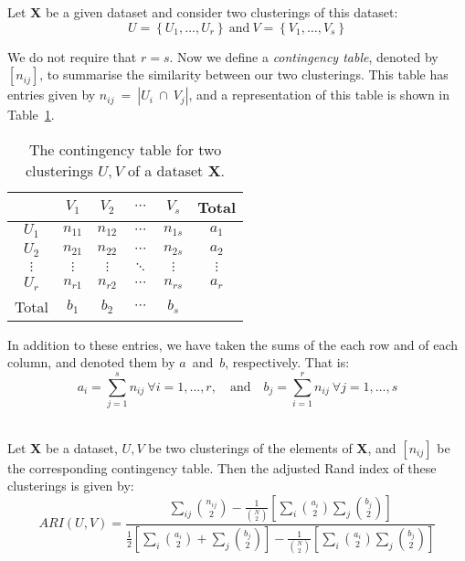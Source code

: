\begin{definition}\label{def:contingency}
    Let \textbf{X} be a given dataset and consider two clusterings of this
    dataset:
    \[
        U = \left\{U_1, \ldots, U_r\right\}
        \ \text{and} \
        V = \left\{V_1, \ldots, V_s\right\}
    \]

    We do not require that \(r = s\). Now we define a \emph{contingency table},
    denoted by \(\left[n_{ij}\right]\), to summarise the similarity between our
    two clusterings. This table has entries given by
    \(n_{ij}~=~|U_i~\cap~V_j|\), and a representation of this table is shown in
    Table~\ref{tab:contingency}.

    \begin{table}[H]
    \centering
    \begin{tabular}{cccccc}
        {} & \(V_1\) & \(V_2\) & \(\cdots\) & \(V_s\) & Total
        \\ \midrule
        \(U_1\) & \(n_{11}\) & \(n_{12}\) & \(\cdots\) & \(n_{1s}\) & \(a_1\)
        \\
        \(U_2\) & \(n_{21}\) & \(n_{22}\) & \(\cdots\) & \(n_{2s}\) & \(a_2\)
        \\
        \(\vdots\) & \(\vdots\) & \(\vdots\) & \(\ddots\) & \(\vdots\) &
        \(\vdots\)
        \\
        \(U_r\) & \(n_{r1}\) & \(n_{r2}\) & \(\cdots\) & \(n_{rs}\) & \(a_r\)
        \\ \midrule
        Total & \(b_1\) & \(b_2\) & \(\cdots\) & \(b_s\) & {}
    \end{tabular}
    \caption{The contingency table for two clusterings \(U, V\) of a dataset
    \textbf{X}.}\label{tab:contingency}
    \end{table}

    In addition to these entries, we have taken the sums of the each row and of
    each column, and denoted them by \(a\)~and~\(b\), respectively. That is:
    \[
        a_i = \sum_{j=1}^s n_{ij} \ \forall i = 1, \ldots, r, \quad \text{and}
        \quad b_j = \sum_{i=1}^r n_{ij} \ \forall j = 1, \ldots, s
    \]\\
\end{definition}

\begin{definition}\label{def:adjusted-rand-index}
    Let \textbf{X} be a dataset, \(U, V\) be two clusterings of the elements of
    \textbf{X}, and \(\left[n_{ij}\right]\) be the corresponding contingency
    table. Then the adjusted Rand index of these clusterings is given by:
    \[
        ARI(U, V) = \frac{\displaystyle{\sum_{ij} {n_{ij}\choose 2} -
        \frac{1}{{N\choose 2}}\left[\sum_i {a_i\choose 2}\sum_j {b_j\choose
        2}\right]}}{\displaystyle{\frac{1}{2} \left[\sum_i {a_i\choose 2} +
        \sum_j{b_j\choose 2}\right] - \frac{1}{{N\choose 2}}\left[\sum_i
        {a_i\choose 2}\sum_j {b_j\choose 2}\right]}}
    \]\\
\end{definition}

